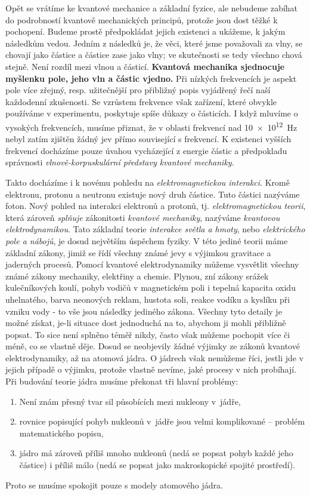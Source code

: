     Opět se vrátíme ke kvantové mechanice a základní fyzice, ale nebudeme zabíhat do podrobností kvantově 
    mechanických principů, protože jsou dost těžké k pochopení. Budeme prostě předpokládat jejich existenci a 
    ukážeme, k jakým následkům vedou. Jedním z následků je, že věci, které jsme považovali za vlny, se 
    chovají jako částice a částice zase jako vlny; ve skutečnosti se tedy všechno chová stejně. Není rozdíl 
    mezi vlnou a částicí. \textbf{Kvantová mechanika sjednocuje myšlenku pole, jeho vln a částic vjedno.} Při 
    nízkých frekvencích je aspekt pole více zřejmý, resp. užitečnější pro přibližný popis vyjádřený řečí naší 
    každodenní zkušenosti. Se vzrůstem frekvence však zařízení, které obvykle používáme v experimentu, 
    poskytuje spíše důkazy o částicích. I když mluvíme o vysokých frekvencích, musíme přiznat, že v oblasti 
    frekvencí nad \SI{10e12}{\Hz} nebyl zatím zjištěn žádný jev přímo související s frekvencí. K existenci 
    vyšších frekvencí docházíme pouze úvahou vycházející z energie částic a předpokladu správnosti 
    \emph{vlnově-korpuskulární představy kvantové mechaniky}.
    
    Takto docházíme i k novému pohledu na \emph{elektromagnetickou interakci}. Kromě elektronu, protonu a 
    neutronu existuje nový druh částice. Tuto částici nazýváme foton. Nový pohled na interakci elektronů a 
    protonů, tj. \emph{elektromagnetickou teorii}, která zároveň \emph{splňuje} zákonitosti \emph{kvantové 
    mechaniky}, nazýváme \emph{kvantovou elektrodynamikou}. Tato základní teorie \emph{interakce světla a 
    hmoty}, nebo \emph{elektrického pole a nábojů}, je dosud největším úspěchem fyziky. V této jediné teorii 
    máme základní zákony, jimiž se řídí všechny známé jevy s výjimkou gravitace a jaderných procesů. Pomocí 
    kvantové elektrodynamiky můžeme vysvětlit všechny známé zákony mechaniky, elektřiny a chemie. Plynou, zní 
    zákony srážek kulečníkových koulí, pohyb vodičů v magnetickém poli i tepelná kapacita oxidu uhelnatého, 
    barva neonových reklam, hustota soli, reakce vodíku a kyslíku při vzniku vody - to vše jsou následky 
    jediného zákona. Všechny tyto detaily je možné získat, je-li situace dost jednoduchá na to, abychom ji 
    mohli přibližně popsat. To sice není splněno téměř nikdy, často však můžeme pochopit více či méně, co se 
    vlastně děje. Dosud se neobjevily žádné výjimky ze zákonů kvantové elektrodynamiky, až na atomová jádra. 
    O jádrech však nemůžeme říci, jestli jde v jejich případě o výjimku, protože vlastně nevíme, jaké procesy 
    v nich probíhají. Při budování teorie jádra musíme překonat tři hlavní problémy:
    \begin{enumerate}
     \item Není znám přesný tvar sil působících mezi nukleony v jádře,
     \item rovnice popisující pohyb nukleonů v jádře jsou velmi komplikované – problém matematického popisu,
     \item jádro má zároveň příliš mnoho nukleonů (nedá se popsat pohyb každé jeho částice) i příliš 
           málo (nedá se popsat jako makroskopické spojité prostředí).   
    \end{enumerate}
    Proto se musíme spokojit pouze s modely atomového jádra. 
    
